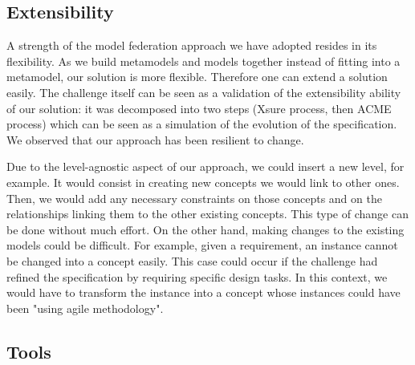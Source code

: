   \subsection{Extensibility}


  A strength of the  model federation approach we have adopted resides in its
  flexibility. As we build metamodels and models together instead of fitting
  into a metamodel, our solution is more flexible. Therefore one can extend a
  solution easily. The challenge itself can be seen as a validation of the
  extensibility ability of our solution: it was decomposed into two steps
  (Xsure process, then ACME process) which can be seen as a simulation of the
  evolution of the  specification. We observed that our approach has been
  resilient to change.

  Due to the level-agnostic aspect of our approach, we could insert a new
  level, for example. It would consist in creating new concepts we would link
  to other ones. Then, we would add any necessary constraints on those concepts
  and on the relationships linking them to the other existing concepts. This type
  of change can be done without much effort. On the other hand, making changes
  to the existing models could be difficult. For example, given a requirement,
  an instance cannot be changed into a concept easily. This case could occur if
  the challenge had refined the specification by requiring specific design tasks.
  In this context, we would have to transform the  instance into a concept
  whose instances could have been "using agile methodology".



\subsection{Tools}


